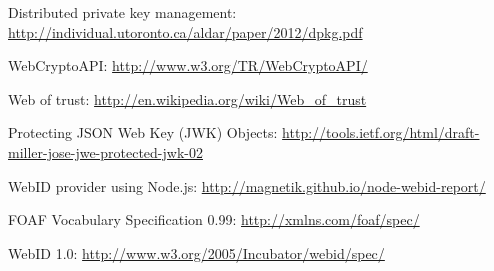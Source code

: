 Distributed private key management:
\url{http://individual.utoronto.ca/aldar/paper/2012/dpkg.pdf}

WebCryptoAPI: \url{http://www.w3.org/TR/WebCryptoAPI/}

Web of trust: \url{http://en.wikipedia.org/wiki/Web_of_trust}

Protecting JSON Web Key (JWK) Objects:
\url{http://tools.ietf.org/html/draft-miller-jose-jwe-protected-jwk-02}

WebID provider using Node.js:
\url{http://magnetik.github.io/node-webid-report/}

FOAF Vocabulary Specification 0.99: \url{http://xmlns.com/foaf/spec/}

WebID 1.0: \url{http://www.w3.org/2005/Incubator/webid/spec/}
